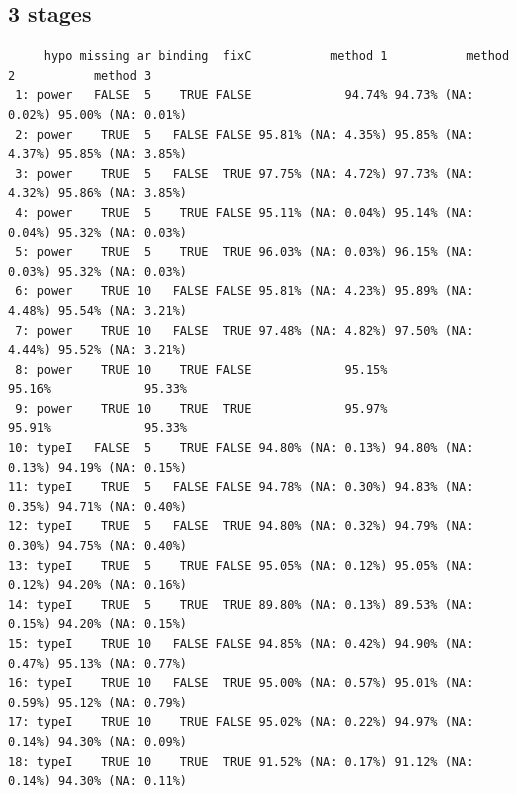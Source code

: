 \documentclass[12pt]{article}
\begin{document}
\clearpage

\subsection{3 stages}
\label{sec:org5c721db}

\begin{verbatim}
     hypo missing ar binding  fixC           method 1           method 2           method 3
 1: power   FALSE  5    TRUE FALSE             94.74% 94.73% (NA: 0.02%) 95.00% (NA: 0.01%)
 2: power    TRUE  5   FALSE FALSE 95.81% (NA: 4.35%) 95.85% (NA: 4.37%) 95.85% (NA: 3.85%)
 3: power    TRUE  5   FALSE  TRUE 97.75% (NA: 4.72%) 97.73% (NA: 4.32%) 95.86% (NA: 3.85%)
 4: power    TRUE  5    TRUE FALSE 95.11% (NA: 0.04%) 95.14% (NA: 0.04%) 95.32% (NA: 0.03%)
 5: power    TRUE  5    TRUE  TRUE 96.03% (NA: 0.03%) 96.15% (NA: 0.03%) 95.32% (NA: 0.03%)
 6: power    TRUE 10   FALSE FALSE 95.81% (NA: 4.23%) 95.89% (NA: 4.48%) 95.54% (NA: 3.21%)
 7: power    TRUE 10   FALSE  TRUE 97.48% (NA: 4.82%) 97.50% (NA: 4.44%) 95.52% (NA: 3.21%)
 8: power    TRUE 10    TRUE FALSE             95.15%             95.16%             95.33%
 9: power    TRUE 10    TRUE  TRUE             95.97%             95.91%             95.33%
10: typeI   FALSE  5    TRUE FALSE 94.80% (NA: 0.13%) 94.80% (NA: 0.13%) 94.19% (NA: 0.15%)
11: typeI    TRUE  5   FALSE FALSE 94.78% (NA: 0.30%) 94.83% (NA: 0.35%) 94.71% (NA: 0.40%)
12: typeI    TRUE  5   FALSE  TRUE 94.80% (NA: 0.32%) 94.79% (NA: 0.30%) 94.75% (NA: 0.40%)
13: typeI    TRUE  5    TRUE FALSE 95.05% (NA: 0.12%) 95.05% (NA: 0.12%) 94.20% (NA: 0.16%)
14: typeI    TRUE  5    TRUE  TRUE 89.80% (NA: 0.13%) 89.53% (NA: 0.15%) 94.20% (NA: 0.15%)
15: typeI    TRUE 10   FALSE FALSE 94.85% (NA: 0.42%) 94.90% (NA: 0.47%) 95.13% (NA: 0.77%)
16: typeI    TRUE 10   FALSE  TRUE 95.00% (NA: 0.57%) 95.01% (NA: 0.59%) 95.12% (NA: 0.79%)
17: typeI    TRUE 10    TRUE FALSE 95.02% (NA: 0.22%) 94.97% (NA: 0.14%) 94.30% (NA: 0.09%)
18: typeI    TRUE 10    TRUE  TRUE 91.52% (NA: 0.17%) 91.12% (NA: 0.14%) 94.30% (NA: 0.11%)
\end{verbatim}
\end{document}

